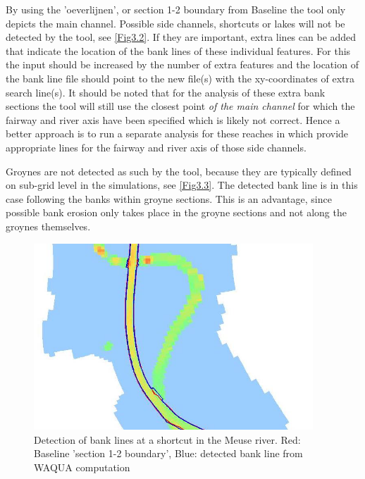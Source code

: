 By using the 'oeverlijnen', or section 1-2 boundary from Baseline the tool only depicts the main channel.
Possible side channels, shortcuts or lakes will not be detected by the tool, see \autoref{Fig3.2}.
If they are important, extra lines can be added that indicate the location of the bank lines of these individual features.
For this the input  should be increased by the number of extra features and the location of the bank line file  should point to the new file(s) with the xy-coordinates of extra search line(s).
It should be noted that for the analysis of these extra bank sections the tool will still use the closest point \emph{of the main channel} for which the fairway and river axis have been specified which is likely not correct.
Hence a better approach is to run a separate analysis for these reaches in which provide appropriate lines for the fairway and river axis of those side channels.

Groynes are not detected as such by the tool, because they are typically defined on sub-grid level in the simulations, see \autoref{Fig3.3}.
The detected bank line is in this case following the banks within groyne sections.
This is an advantage, since possible bank erosion only takes place in the groyne sections and not along the groynes themselves.

\begin{figure}[!h]
\includegraphics[width=\textwidth,height=7cm]{figures/Fig3-2.png}
\caption{Detection of bank lines at a shortcut in the Meuse river.
Red: Baseline 'section 1-2 boundary', Blue: detected bank line from WAQUA computation}
\label{Fig3.2}
\end{figure}

